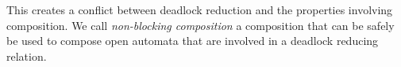 \documentclass[runningheads]{llncs}
\begin{document}
This creates a conflict between deadlock reduction and the properties involving composition. 
We call \emph{non-blocking composition} a composition that can be safely be used to compose open automata that are involved in a deadlock reducing relation.
\end{document}
